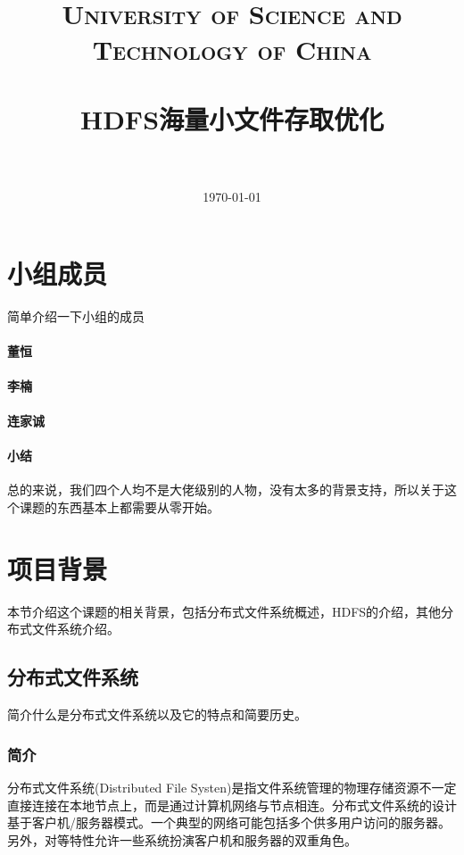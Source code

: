 \documentclass[UTF8]{ctexart}
\title{
  \normalfont \normalsize 
  \textsc{\\~\\~\\~\\~\\~\\University of Science and Technology of China} \\ [25pt] %
  \horrule{0.5pt} \\[0.4cm] %
  \huge HDFS海量小文件存取优化 \\ %
  \horrule{2pt} \\[0.5cm] %
}
\date{\today}
\begin{document}
\maketitle
\clearpage
\tableofcontents
\clearpage
\section{小组成员}
简单介绍一下小组的成员

\paragraph{董恒}

\paragraph{李楠}

\paragraph{连家诚}

\paragraph{小结}
总的来说，我们四个人均不是大佬级别的人物，没有太多的背景支持，所以关于这个课题的东西基本上都需要从零开始。






\section{项目背景}
本节介绍这个课题的相关背景，包括分布式文件系统概述，HDFS的介绍，其他分布式文件系统介绍。

\subsection{分布式文件系统}
简介什么是分布式文件系统以及它的特点和简要历史。

\subsubsection{简介}
分布式文件系统(Distributed File Systen)是指文件系统管理的物理存储资源不一定直接连接在本地节点上，而是通过计算机网络与节点相连。分布式文件系统的设计基于客户机/服务器模式。一个典型的网络可能包括多个供多用户访问的服务器。另外，对等特性允许一些系统扮演客户机和服务器的双重角色。
\end{document}
